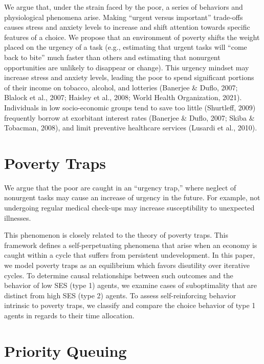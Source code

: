 \documentclass[
]{report}
\begin{document}
We argue that, under the strain faced by the poor, a series of behaviors
and physiological phenomena arise. Making ``urgent versus important''
trade-offs causes stress and anxiety levels to increase and shift
attention towards specific features of a choice. We propose that an
environment of poverty shifts the weight placed on the urgency of a task
(e.g., estimating that urgent tasks will ``come back to bite'' much
faster than others and estimating that nonurgent opportunities are
unlikely to disappear or change). This urgency mindset may increase
stress and anxiety levels, leading the poor to spend significant
portions of their income on tobacco, alcohol, and lotteries (Banerjee \&
Duflo, 2007; Blalock et al., 2007; Haisley et al., 2008; World Health
Organization, 2021). Individuals in low socio-economic groups tend to
save too little (Shurtleff, 2009) frequently borrow at exorbitant
interest rates (Banerjee \& Duflo, 2007; Skiba \& Tobacman, 2008), and
limit preventive healthcare services (Lusardi et al., 2010).

\hypertarget{poverty-traps}{%
\section{Poverty Traps}\label{poverty-traps}}

We argue that the poor are caught in an ``urgency trap,'' where neglect
of nonurgent tasks may cause an increase of urgency in the future. For
example, not undergoing regular medical check-ups may increase
susceptibility to unexpected illnesses.

This phenomenon is closely related to the theory of poverty traps. This
framework defines a self-perpetuating phenomena that arise when an
economy is caught within a cycle that suffers from persistent
undevelopment. In this paper, we model poverty traps as an equilibrium
which favors disutility over iterative cycles. To determine causal
relationships between such outcomes and the behavior of low SES (type 1)
agents, we examine cases of suboptimality that are distinct from high
SES (type 2) agents. To assess self-reinforcing behavior intrinsic to
poverty traps, we classify and compare the choice behavior of type 1
agents in regards to their time allocation.

\hypertarget{priority-queuing}{%
\section{Priority Queuing}\label{priority-queuing}}
\end{document}
